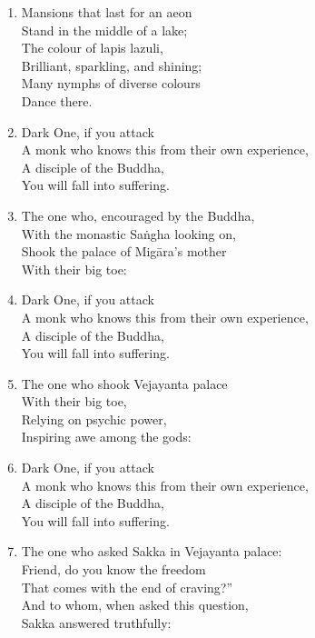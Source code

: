 \documentclass[10pt, openany]{book}
\newcommand*{\vleftofline}[1]{\leavevmode\llap{#1}}
\begin{document}
\begin{enumerate}
\item \vleftofline{‘}Mansions that last for an aeon\\
Stand in the middle of a lake;\\
The colour of lapis lazuli,\\
Brilliant, sparkling, and shining;\\
Many nymphs of diverse colours\\
Dance there.

\item \vleftofline{‘}Dark One, if you attack\\
A monk who knows this from their own experience,\\
A disciple of the Buddha,\\
You will fall into suffering.

\item \vleftofline{‘}The one who, encouraged by the Buddha,\\
With the monastic Saṅgha looking on,\\
Shook the palace of Migāra’s mother\\
With their big toe:

\item \vleftofline{‘}Dark One, if you attack\\
A monk who knows this from their own experience,\\
A disciple of the Buddha,\\
You will fall into suffering.

\item \vleftofline{‘}The one who shook Vejayanta palace\\
With their big toe,\\
Relying on psychic power,\\
Inspiring awe among the gods:

\item \vleftofline{‘}Dark One, if you attack\\
A monk who knows this from their own experience,\\
A disciple of the Buddha,\\
You will fall into suffering.

\item \vleftofline{‘}The one who asked Sakka in Vejayanta palace:\\
\vleftofline{“}Friend, do you know the freedom\\
That comes with the end of craving?”\\
And to whom, when asked this question,\\
Sakka answered truthfully:


\end{enumerate}
\end{document}
